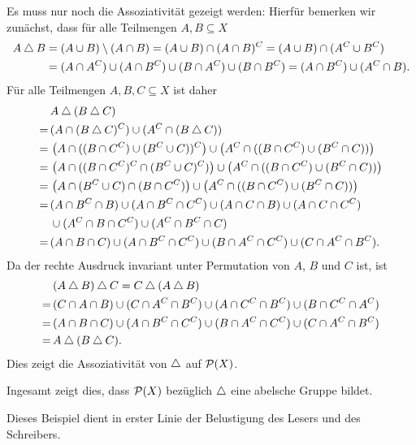 Es muss nur noch die Assoziativität gezeigt werden: Hierfür bemerken wir zunächst, dass für alle Teilmengen $A, B \subseteq X$
\begin{align*}
 A \bigtriangleup B
 &= (A \cup B) \setminus (A \cap B)
 = (A \cup B) \cap (A \cap B)^C
 = (A \cup B) \cap (A^C \cup B^C) \\
 &= (A \cap A^C) \cup (A \cap B^C) \cup (B \cap A^C) \cup (B \cap B^C)
 = (A \cap B^C) \cup (A^C \cap B).
\end{align*}
Für alle Teilmengen $A, B, C \subseteq X$ ist daher
\begin{align*}
  &\, A \bigtriangleup (B \bigtriangleup C) \\
 =&\, (A \cap (B \bigtriangleup C)^C) \cup (A^C \cap (B \bigtriangleup C)) \\
 =&\, \left( A \cap ((B \cap C^C) \cup (B^C \cup C))^C \right)
      \cup \left( A^C \cap ((B \cap C^C) \cup (B^C \cap C)) \right) \\
 =&\, \left( A \cap ((B \cap C^C)^C \cap (B^C \cup C)^C) \right)
      \cup \left( A^C \cap ((B \cap C^C) \cup (B^C \cap C)) \right) \\
 =&\, \left( A \cap (B^C \cup C) \cap (B \cap C^C) \right)
      \cup \left( A^C \cap ((B \cap C^C) \cup (B^C \cap C)) \right) \\
 =&\, (A \cap B^C \cap B) \cup (A \cap B^C \cap C^C) \cup (A \cap C \cap B) \cup (A \cap C \cap C^C) \\
  &\, \cup (A^C \cap B \cap C^C) \cup (A^C \cap B^C \cap C) \\
 =&\, (A \cap B \cap C) \cup (A \cap B^C \cap C^C) \cup (B \cap A^C \cap C^C) \cup (C \cap A^C \cap B^C).
\end{align*}
Da der rechte Ausdruck invariant unter Permutation von $A$, $B$ und $C$ ist, ist
\begin{align*}
  &\, (A \bigtriangleup B) \bigtriangleup C
 =    C \bigtriangleup (A \bigtriangleup B) \\
 =&\, (C \cap A \cap B) \cup (C \cap A^C \cap B^C) \cup (A \cap C^C \cap B^C) \cup (B \cap C^C \cap A^C) \\
 =&\, (A \cap B \cap C) \cup (A \cap B^C \cap C^C) \cup (B \cap A^C \cap C^C) \cup (C \cap A^C \cap B^C) \\
 =&\, A \bigtriangleup (B \bigtriangleup C).
\end{align*}
Dies zeigt die Assoziativität von $\bigtriangleup$ auf $\mathcal{P}(X)$.

Ingesamt zeigt dies, dass $\mathcal{P}(X)$ bezüglich $\bigtriangleup$ eine abelsche Gruppe bildet.


\begin{bem}
 Dieses Beispiel dient in erster Linie der Belustigung des Lesers und des Schreibers.
\end{bem}






